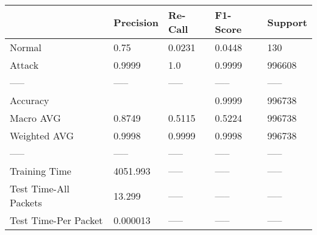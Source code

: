 \begin{tabular}{lllll}
\toprule
{} & Precision & Re-Call & F1-Score & Support \\
\midrule
Normal                &      0.75 &  0.0231 &   0.0448 &     130 \\
Attack                &    0.9999 &     1.0 &   0.9999 &  996608 \\
-----                 &     ----- &   ----- &    ----- &   ----- \\
Accuracy              &           &         &   0.9999 &  996738 \\
Macro AVG             &    0.8749 &  0.5115 &   0.5224 &  996738 \\
Weighted AVG          &    0.9998 &  0.9999 &   0.9998 &  996738 \\
-----                 &     ----- &   ----- &    ----- &   ----- \\
Training Time         &  4051.993 &   ----- &    ----- &   ----- \\
Test Time-All Packets &    13.299 &   ----- &    ----- &   ----- \\
Test Time-Per Packet  &  0.000013 &   ----- &    ----- &   ----- \\
\bottomrule
\end{tabular}

